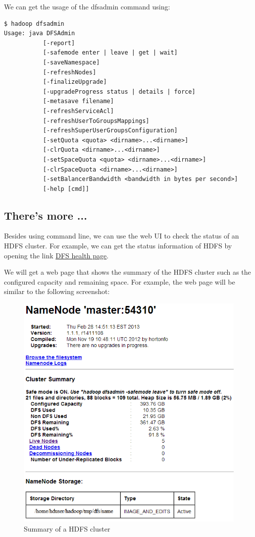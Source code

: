 We can get the usage of the dfsadmin command using: 
\begin{verbatim}
$ hadoop dfsadmin
Usage: java DFSAdmin
           [-report]
           [-safemode enter | leave | get | wait]
           [-saveNamespace]
           [-refreshNodes]
           [-finalizeUpgrade]
           [-upgradeProgress status | details | force]
           [-metasave filename]
           [-refreshServiceAcl]
           [-refreshUserToGroupsMappings]
           [-refreshSuperUserGroupsConfiguration]
           [-setQuota <quota> <dirname>...<dirname>]
           [-clrQuota <dirname>...<dirname>]
           [-setSpaceQuota <quota> <dirname>...<dirname>]
           [-clrSpaceQuota <dirname>...<dirname>]
           [-setBalancerBandwidth <bandwidth in bytes per second>]
           [-help [cmd]]
\end{verbatim}

\subsection*{There's more ...}
Besides using command line, we can use the web UI to check the status of an HDFS cluster. For example, we can get the status information of HDFS by opening the link \href{http://master:50070/dfshealth.jsp}{DFS health page}.

We will get a web page that shows the summary of the HDFS cluster such as the configured capacity and remaining space. For example, the web page will be similar to the following screenshot:
\begin{figure}[h]
  \centering
  \includegraphics[width=.7\textwidth]{figs/5163os_04_08.png}
  \caption{Summary of a HDFS cluster}\label{fig:hdfs.summary}
\end{figure} 

